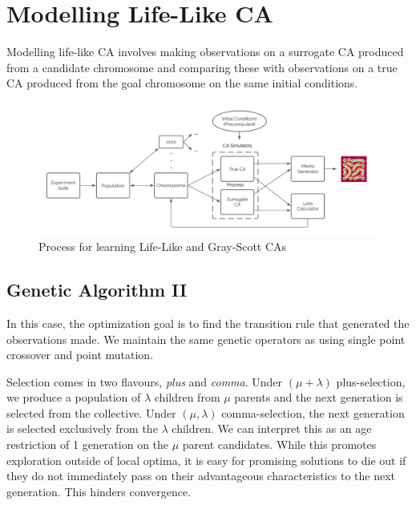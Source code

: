 \chapter{Modelling Life-Like CA} \label{lifelike}

Modelling life-like CA involves making observations on a surrogate CA produced from a candidate chromosome and comparing these with observations on a true CA produced from the goal chromosome on the same initial conditions.

\begin{figure}[!h]
\centering
    \includegraphics[width=\textwidth]{images/dataflow.png}
    \caption{Process for learning Life-Like and Gray-Scott CAs}
\label{fig:dataflow}
\end{figure}

\section{Genetic Algorithm II} \label{sec:ga-2}

In this case, the optimization goal is to find the transition rule that generated the observations made. We maintain the same genetic operators as  using single point crossover and point mutation.

Selection comes in two flavours, \textit{plus} and \textit{comma}. Under  $(\mu + \lambda)$ plus-selection, we produce a population of $\lambda$ children from $\mu$ parents and the next generation is selected from the collective. Under $(\mu, \lambda)$ comma-selection, the next generation is selected exclusively from the $\lambda$ children. We can interpret this as an age restriction of 1 generation on the $\mu$ parent candidates. While this promotes exploration outside of local optima, it is easy for promising solutions to die out if they do not immediately pass on their advantageous characteristics to the next generation. This hinders convergence.\\

